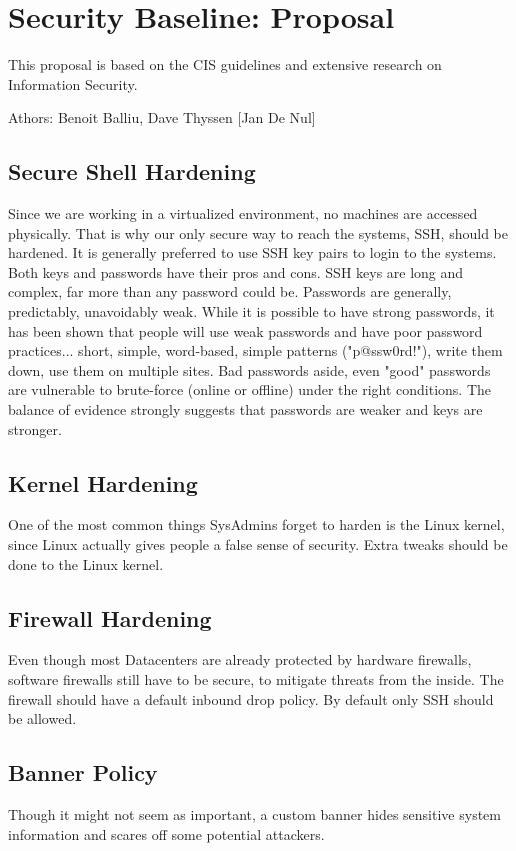 \section{Security Baseline: Proposal}
This proposal is based on the CIS guidelines and extensive research on Information Security. 

Athors: Benoit Balliu, Dave Thyssen [Jan De Nul]

\subsection{Secure Shell Hardening}
Since we are working in a virtualized environment, no machines are accessed physically. That is why our only secure way to reach the systems, SSH, should be hardened. 
It is generally preferred to use SSH key pairs to login to the systems. 
Both keys and passwords have their pros and cons. SSH keys are long and complex, far more than any password could be. Passwords are generally, predictably, unavoidably weak. While it is possible to have strong passwords, it has been shown that people will use weak passwords and have poor password practices... short, simple, word-based, simple patterns ("p@ssw0rd!"), write them down, use them on multiple sites.
Bad passwords aside, even "good" passwords are vulnerable to brute-force (online or offline) under the right conditions.
The balance of evidence strongly suggests that passwords are weaker and keys are stronger.

\subsection{Kernel Hardening}
One of the most common things SysAdmins forget to harden is the Linux kernel, since Linux actually gives people a false sense of security. Extra tweaks should be done to the Linux kernel. 

\subsection{Firewall Hardening}
Even though most Datacenters are already protected by hardware firewalls, software firewalls still have to be secure, to mitigate threats from the inside. The firewall should have a default inbound drop policy. By default only SSH should be allowed. 

\subsection{Banner Policy}
Though it might not seem as important, a custom banner hides sensitive system information and scares off some potential attackers. 

